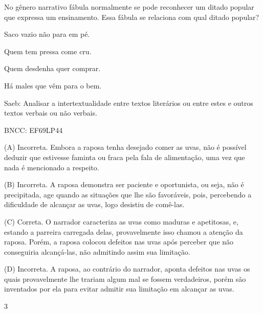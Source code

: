 
No gênero narrativo fábula normalmente se pode reconhecer um ditado
popular que expressa um ensinamento. Essa fábula se relaciona com qual
ditado popular?

\begin{escolha}
\item Saco vazio não para em pé.

\item Quem tem pressa come cru.

\item Quem desdenha quer comprar.

\item Há males que vêm para o bem.
\end{escolha}

Saeb: Analisar a intertextualidade entre textos literários ou entre
estes e outros textos verbais ou não verbais.

BNCC: EF69LP44

(A) Incorreta. Embora a raposa tenha desejado comer as uvas, não é
possível deduzir que estivesse faminta ou fraca pela fala de
alimentação, uma vez que nada é mencionado a respeito.

(B) Incorreta. A raposa demonstra ser paciente e oportunista, ou seja,
não é precipitada, age quando as situações que lhe são favoráveis, pois,
percebendo a dificuldade de alcançar as uvas, logo desistiu de comê-las.

(C) Correta. O narrador caracteriza as uvas como maduras e apetitosas,
e, estando a parreira carregada delas, provavelmente isso chamou a
atenção da raposa. Porém, a raposa colocou defeitos nas uvas após
perceber que não conseguiria alcançá-las, não admitindo assim sua
limitação.

(D) Incorreta. A raposa, ao contrário do narrador, aponta defeitos nas
uvas os quais provavelmente lhe trariam algum mal se fossem verdadeiros,
porém são inventados por ela para evitar admitir sua limitação em
alcançar as uvas.

\num{3}

